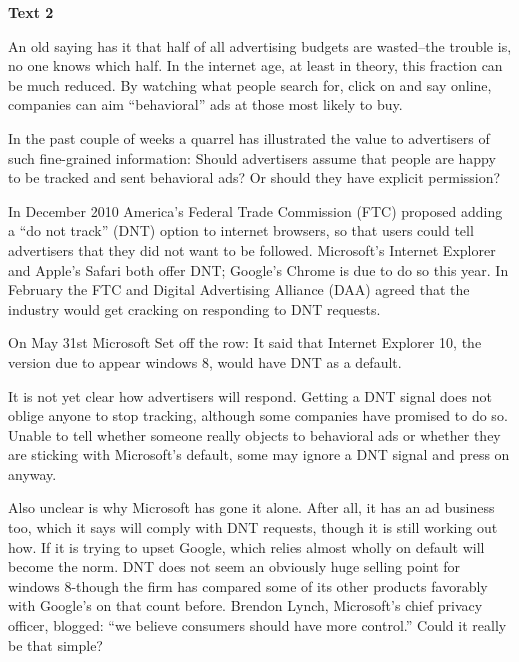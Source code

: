 \begin{center}\textbf{Text 2}\end{center}

An old saying has it that half of all advertising budgets are wasted--the trouble is, no one knows which half. In the internet age, at least in theory, this fraction can be much reduced. By watching what people search for, click on and say online, companies can aim ``behavioral'' ads at those most likely to buy.

In the past couple of weeks a quarrel has illustrated the value to advertisers of such fine-grained information: Should advertisers assume that people are happy to be tracked and sent behavioral ads? Or should they have explicit permission?

In December 2010 America's Federal Trade Commission (FTC) proposed adding a ``do not track'' (DNT) option to internet browsers, so that users could tell advertisers that they did not want to be followed. Microsoft's Internet Explorer and Apple's Safari both offer DNT; Google's Chrome is due to do so this year. In February the FTC and Digital Advertising Alliance (DAA) agreed that the industry would get cracking on responding to DNT requests.

On May 31st Microsoft Set off the row: It said that Internet Explorer 10, the version due to appear windows 8, would have DNT as a default.

It is not yet clear how advertisers will respond. Getting a DNT signal does not oblige anyone to stop tracking, although some companies have promised to do so. Unable to tell whether someone really objects to behavioral ads or whether they are sticking with Microsoft’s default, some may ignore a DNT signal and press on anyway.

Also unclear is why Microsoft has gone it alone. After all, it has an ad business too, which it says will comply with DNT requests, though it is still working out how. If it is trying to upset Google, which relies almost wholly on default will become the norm. DNT does not seem an obviously huge selling point for windows 8-though the firm has compared some of its other products favorably with Google's on that count before. Brendon Lynch, Microsoft's chief privacy officer, blogged: ``we believe consumers should have more control.'' Could it really be that simple?

